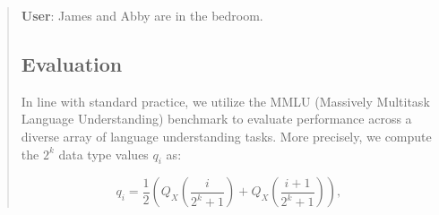 \begin{quote}
    \textbf{User}: James and Abby are in the bedroom. \subsection{Evaluation}

In line with standard practice, we utilize the MMLU (Massively Multitask Language Understanding) benchmark \citep{hendrycksmeasuring} to evaluate performance across a diverse array of language understanding tasks. More precisely, we compute the $2^k$ data type values $q_i$ as:

\begin{equation}
q_i  = \frac{1}{2}\left( Q_X\left(\frac{i}{2^k+1}\right) + Q_X\left(\frac{i+1}{2^k+1}\right)\right),
\end{equation}


\end{quote}
